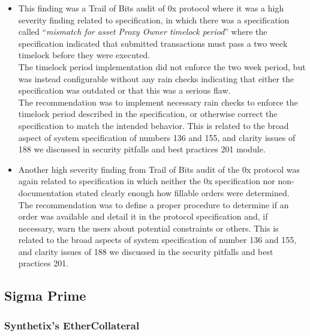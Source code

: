 \begin{itemize}
\item
  This finding was a Trail of Bits audit of 0x protocol where it was a
  high severity finding related to specification, in which there was a
  specification called ``\emph{mismatch for asset Proxy Owner timelock
  period}'' where the specification indicated that submitted
  transactions must pass a two week timelock before they were
  executed.\\

  The timelock period implementation did not enforce the two week
  period, but was instead configurable without any rain checks
  indicating that either the specification was outdated or that this was
  a serious flaw.\\

  The recommendation was to implement necessary rain checks to enforce
  the timelock period described in the specification, or otherwise
  correct the specification to match the intended behavior. This is
  related to the broad aspect of system specification of numbers 136 and
  155, and clarity issues of 188 we discussed in security pitfalls and
  best practices 201 module.
\item
  Another high severity finding from Trail of Bits audit of the 0x
  protocol was again related to specification in which neither the 0x
  specification nor non-documentation stated clearly enough how fillable
  orders were determined.\\

  The recommendation was to define a proper procedure to determine if an
  order was available and detail it in the protocol specification and,
  if necessary, warn the users about potential constraints or others.
  This is related to the broad aspects of system specification of number
  136 and 155, and clarity issues of 188 we discussed in the security
  pitfalls and best practices 201.
\end{itemize}

\subsection{Sigma Prime}\label{sigma-prime}

\subsubsection{Synthetix's
EtherCollateral}\label{synthetixs-ethercollateral}

